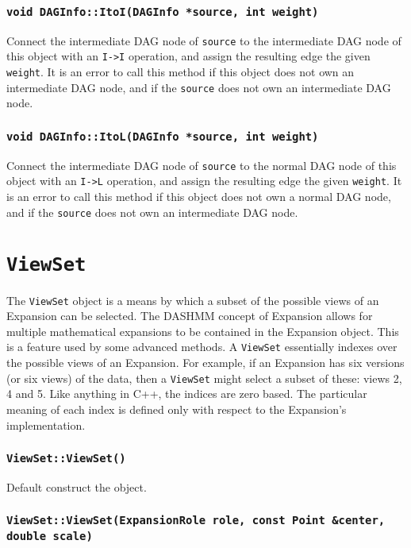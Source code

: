 \subsubsection{\texttt{void DAGInfo::ItoI(DAGInfo *source, int weight)}}

Connect the intermediate DAG node of \texttt{source} to the intermediate DAG
node of this object with an \texttt{I->I} operation, and assign the resulting
edge the given \texttt{weight}. It is an error to call this method if this
object does not own an intermediate DAG node, and if the \texttt{source} does
not own an intermediate DAG node.

\subsubsection{\texttt{void DAGInfo::ItoL(DAGInfo *source, int weight)}}

Connect the intermediate DAG node of \texttt{source} to the normal DAG
node of this object with an \texttt{I->L} operation, and assign the resulting
edge the given \texttt{weight}. It is an error to call this method if this
object does not own a normal DAG node, and if the \texttt{source} does
not own an intermediate DAG node.



\section{\texttt{ViewSet}}

The \texttt{ViewSet} object is a means by which a subset of the possible views
of an Expansion can be selected. The DASHMM concept of Expansion allows for
multiple mathematical expansions to be contained in the Expansion object. This
is a feature used by some advanced methods. A \texttt{ViewSet} essentially
indexes over the possible views of an Expansion. For example, if an
Expansion has six versions (or six views) of the data, then a \texttt{ViewSet}
might select a subset of these: views 2, 4 and 5. Like anything in C++, the
indices are zero based. The particular meaning of each index is defined only
with respect to the Expansion's implementation.

\subsubsection{\texttt{ViewSet::ViewSet()}}

Default construct the object.

\subsubsection{\texttt{ViewSet::ViewSet(ExpansionRole role, const Point \&center, double scale)}}

